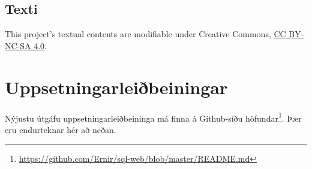 \documentclass[a4paper,12pt,twoside,BCOR=10mm]{scrbook}
\begin{document}
\section{Texti}\label{contents}

This project's textual contents are modifiable under Creative Commons,
\href{http://creativecommons.org/licenses/by-nc-sa/4.0/}{CC BY-NC-SA
4.0}.

\chapter{Uppsetningarleiðbeiningar}
\label{sec:installation}
Nýjustu útgáfu uppsetningarleiðbeininga má finna á Github-síðu höfundar\footnote{\url{https://github.com/Ernir/sql-web/blob/master/README.md}}. Þær eru endurteknar hér að neðan.


\end{document}
